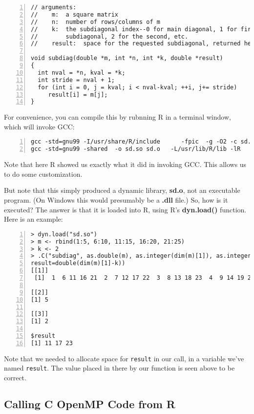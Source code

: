 \begin{lstlisting}[numbers=left]
// arguments:
//    m:  a square matrix
//    n:  number of rows/columns of m
//    k:  the subdiagonal index--0 for main diagonal, 1 for first
//        subdiagonal, 2 for the second, etc.
//    result:  space for the requested subdiagonal, returned here

void subdiag(double *m, int *n, int *k, double *result)
{
  int nval = *n, kval = *k;
  int stride = nval + 1;
  for (int i = 0, j = kval; i < nval-kval; ++i, j+= stride)
     result[i] = m[j];
}
\end{lstlisting}

For convenience, you can compile this by rubnning R in a terminal
window, which will invoke GCC:

\begin{lstlisting}[numbers=left]
% R CMD SHLIB sd.c
gcc -std=gnu99 -I/usr/share/R/include      -fpic  -g -O2 -c sd.c -o sd.o
gcc -std=gnu99 -shared  -o sd.so sd.o   -L/usr/lib/R/lib -lR
\end{lstlisting}

Note that here R showed us exactly what it did in invoking GCC.  This
allows us to do some customization.

But note that this simply produced a dynamic library, {\bf sd.o}, not an
executable program.  (On Windows this would presumably be a {\bf .dll}
file.)  So, how is it executed?  The answer is that it is loaded into R,
using R's {\bf dyn.load()} function.  Here is an example:

\begin{lstlisting}[numbers=left]
> dyn.load("sd.so")
> m <- rbind(1:5, 6:10, 11:15, 16:20, 21:25)
> k <- 2
> .C("subdiag", as.double(m), as.integer(dim(m)[1]), as.integer(k),
result=double(dim(m)[1]-k))
[[1]]
 [1]  1  6 11 16 21  2  7 12 17 22  3  8 13 18 23  4  9 14 19 24  5 10 15 20 25

[[2]]
[1] 5

[[3]]
[1] 2

$result
[1] 11 17 23
\end{lstlisting}

Note that we needed to allocate space for {\tt result} in our call, in a
variable we've named {\tt result}.  The value placed in there by our 
function is seen above to be correct.

\subsection{Calling C OpenMP Code from R}

